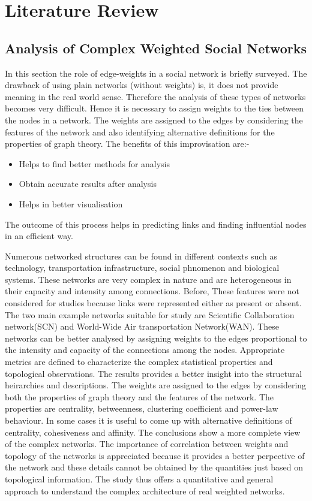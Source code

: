 \section{Literature Review}
\subsection{Analysis of Complex Weighted Social Networks}

In this section the role of edge-weights in a social network is briefly surveyed. The drawback of using plain networks (without weights) is, it does not provide meaning in the real world sense. Therefore the analysis of these types of networks becomes very difficult. Hence it is necessary to assign weights to the ties between the nodes in a network. The weights are assigned to the edges by considering the features of the network and also identifying alternative definitions for the properties of graph theory. The benefits of this improvisation are:-
\begin{itemize}
\item Helps to find better methods for analysis
\item Obtain accurate results after analysis
\item Helps in better visualisation
\end{itemize}

The outcome of this process helps in predicting links and finding influential nodes in an efficient way.

Numerous networked structures can be found in different contexts such as technology, transportation infrastructure, social phnomenon and biological systems. These networks are very complex in nature and are heterogeneous in their capacity and intensity among connections. Before, These features were not considered for studies because links were represented either as present or absent. The two main example networks suitable for study are Scientific Collaboration network(SCN) and World-Wide Air transportation Network(WAN). These networks can be better analysed by assigning weights to the edges proportional to the intensity and capacity of the connections among the nodes. Appropriate metrics are defined to characterize the complex statistical properties and topological observations. The results provides a better insight into the structural heirarchies and descriptions.
The weights are assigned to the edges by considering both the properties of graph theory and the features of the network. The properties are centrality, betweenness, clustering coefficient and power-law behaviour. In some cases it is useful to come up with alternative definitions of centrality, cohesiveness and affinity. The conclusions show a more complete view of the complex networks. The importance of correlation between weights and topology of the networks is appreciated because it provides a better perpective of the network and these details cannot be obtained by the quantities just based on topological information. The study thus offers a quantitative and general approach to understand the complex architecture of real weighted networks.\cite{Barrat2004}

